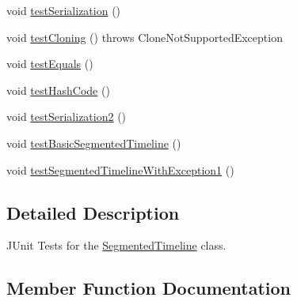 \begin{DoxyCompactItemize}
\item 
void \mbox{\hyperlink{classorg_1_1jfree_1_1chart_1_1axis_1_1_segmented_timeline_test_a51f6ae59596ccc801f951d00581b83d4}{test\+Serialization}} ()
\item 
void \mbox{\hyperlink{classorg_1_1jfree_1_1chart_1_1axis_1_1_segmented_timeline_test_a83b6a6b660dffbd11196f6d2676e0f39}{test\+Cloning}} ()  throws Clone\+Not\+Supported\+Exception 
\item 
void \mbox{\hyperlink{classorg_1_1jfree_1_1chart_1_1axis_1_1_segmented_timeline_test_af5511aef29d51f2e4d1734667c3edc1e}{test\+Equals}} ()
\item 
void \mbox{\hyperlink{classorg_1_1jfree_1_1chart_1_1axis_1_1_segmented_timeline_test_a2df66122b74e651c39f0cc19ac7d83f3}{test\+Hash\+Code}} ()
\item 
void \mbox{\hyperlink{classorg_1_1jfree_1_1chart_1_1axis_1_1_segmented_timeline_test_a085a28a76361d91e550aedd8b98952f2}{test\+Serialization2}} ()
\item 
void \mbox{\hyperlink{classorg_1_1jfree_1_1chart_1_1axis_1_1_segmented_timeline_test_a82d8d707731f231b955f26e1ae43e81f}{test\+Basic\+Segmented\+Timeline}} ()
\item 
void \mbox{\hyperlink{classorg_1_1jfree_1_1chart_1_1axis_1_1_segmented_timeline_test_afe81ed114e8b09cee31bd664f328c5d0}{test\+Segmented\+Timeline\+With\+Exception1}} ()
\end{DoxyCompactItemize}


\subsection{Detailed Description}
J\+Unit Tests for the \mbox{\hyperlink{classorg_1_1jfree_1_1chart_1_1axis_1_1_segmented_timeline}{Segmented\+Timeline}} class. 

\subsection{Member Function Documentation}
\mbox{\label{classorg_1_1jfree_1_1chart_1_1axis_1_1_segmented_timeline_test_a5380d48e6ed9c9d59eb23b9269d02cca}} 
